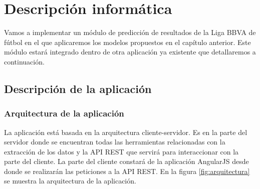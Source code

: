 \chapter{Descripción informática}

Vamos a implementar un módulo de predicción de resultados de la Liga BBVA de fútbol en el que aplicaremos los modelos propuestos en el capítulo anterior. Este módulo estará integrado dentro de otra aplicación ya existente que detallaremos a continuación.

\section{Descripción de la aplicación}
\subsection{Arquitectura de la aplicación}
La aplicación está basada en la arquitectura cliente-servidor. Es en la parte del servidor donde se encuentran todas las herramientas relacionadas con la extracción de los datos y la API REST que servirá para interaccionar con la parte del cliente. La parte del cliente constará de la aplicación AngularJS desde donde se realizarán las peticiones a la API REST. En la figura \ref{fig:arquitectura} se muestra la arquitectura de la aplicación.

